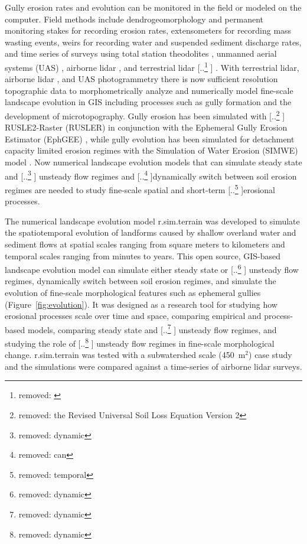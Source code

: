 \documentclass[gmd, manuscript]{copernicus}
\providecommand{\DIFadd}[1]{{\protect\color{blue} \sf #1}} %
\providecommand{\DIFdel}[1]{{\protect\color{red} [..\footnote{removed: #1} ]}} %
\providecommand{\DIFaddbegin}{} %
\providecommand{\DIFaddend}{} %
\providecommand{\DIFdelbegin}{} %
\providecommand{\DIFdelend}{} %
\begin{document}
Gully erosion rates and evolution
can be monitored in the field 
or modeled on the computer. 
Field methods include
dendrogeomorphology \citep{Malik2008} and 
permanent monitoring stakes for recording erosion rates, 
extensometers for recording mass wasting events, 
weirs for recording water and suspended sediment discharge rates, 
and time series of surveys using 
total station theodolites \citep{Thomas2004},
unmanned aerial systems (UAS) \DIFaddbegin \DIFadd{\citep{Jeziorska2016,Kasprak2019,Yang2019}}\DIFaddend ,
airborne lidar \DIFaddbegin \DIFadd{\citep{Perroy2010,Starek2011}}\DIFaddend , 
and terrestrial lidar \DIFdelbegin \DIFdel{\citep{Starek2011,Bechet2016}}\DIFdelend \DIFaddbegin \DIFadd{\citep{Starek2011,Bechet2016,Goodwin2016,Telling2017}}\DIFaddend .
With terrestrial lidar, airborne lidar\DIFaddbegin \DIFadd{, }\DIFaddend and 
UAS photogrammetry
there is now sufficient resolution topographic data 
to morphometrically analyze and 
numerically model fine-scale landscape evolution in GIS
including processes such as gully formation 
and the development of microtopography. 
Gully erosion has been simulated with 
\DIFdelbegin \DIFdel{the Revised Universal Soil Loss Equation Version 2 }\DIFdelend \DIFaddbegin \DIFadd{RUSLE2-Raster }\DIFaddend (RUSLER)
in conjunction with the Ephemeral Gully Erosion Estimator (EphGEE)
\citep{Dabney2014},
while gully evolution
has been simulated for detachment capacity limited erosion regimes
with the Simulation of Water Erosion (SIMWE) model
\citep{Koco2011, Mitasova2013}. 
Now numerical landscape evolution models 
that can simulate 
steady state and \DIFdelbegin \DIFdel{dynamic }\DIFdelend \DIFaddbegin \DIFadd{unsteady }\DIFaddend flow regimes
and \DIFdelbegin \DIFdel{can }\DIFdelend dynamically switch between soil erosion regimes 
are needed to study 
fine-scale spatial and short-term \DIFdelbegin \DIFdel{temporal }\DIFdelend erosional processes.

The numerical landscape evolution model 
r.sim.terrain was developed to 
simulate the spatiotemporal evolution of landforms
caused by shallow overland water and sediment flows
at spatial scales ranging from
square meters to kilometers
and temporal scales ranging from minutes to years. 
This open source, GIS-based landscape evolution model can
simulate either steady state or \DIFdelbegin \DIFdel{dynamic }\DIFdelend \DIFaddbegin \DIFadd{unsteady }\DIFaddend flow regimes,
dynamically switch between soil erosion regimes, and
simulate the evolution of fine-scale morphological features 
such as ephemeral gullies
(Figure~\ref{fig:evolution}).
It was designed as a research tool for
studying how erosional processes scale over time and space,
comparing empirical and process-based models, 
comparing steady state and \DIFdelbegin \DIFdel{dynamic }\DIFdelend \DIFaddbegin \DIFadd{unsteady }\DIFaddend flow regimes, and
studying the role of \DIFdelbegin \DIFdel{dynamic }\DIFdelend \DIFaddbegin \DIFadd{unsteady }\DIFaddend flow regimes
in fine-scale morphological change. 
r.sim.terrain was tested with 
a subwatershed scale (450~\unit{m}$^{2}$) case study
and the simulations were compared against 
a time-series of airborne lidar surveys.
\end{document}
